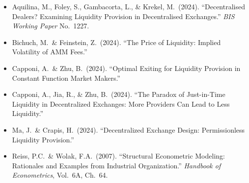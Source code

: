 \documentclass[11pt,a4paper]{article}
\begin{document}
\begin{itemize}[nosep]
  \item Aquilina, M., Foley, S., Gambacorta, L., \& Krekel, M.\ (2024).
        ``Decentralised Dealers? Examining Liquidity Provision in
        Decentralised Exchanges.'' \textit{BIS Working Paper} No.~1227.

  \item Bichuch, M.\ \& Feinstein, Z.\ (2024). ``The Price of Liquidity:
        Implied Volatility of AMM Fees.''

  \item Capponi, A.\ \& Zhu, B.\ (2024). ``Optimal Exiting for Liquidity
        Provision in Constant Function Market Makers.''

  \item Capponi, A., Jia, R., \& Zhu, B.\ (2024). ``The Paradox of
        Just-in-Time Liquidity in Decentralized Exchanges: More Providers
        Can Lead to Less Liquidity.''

  \item Ma, J.\ \& Crapis, H.\ (2024). ``Decentralized Exchange Design:
        Permissionless Liquidity Provision.''

  \item Reiss, P.C.\ \& Wolak, F.A.\ (2007). ``Structural Econometric
        Modeling: Rationales and Examples from Industrial Organization.''
        \textit{Handbook of Econometrics}, Vol.~6A, Ch.~64.
\end{itemize}
\end{document}
